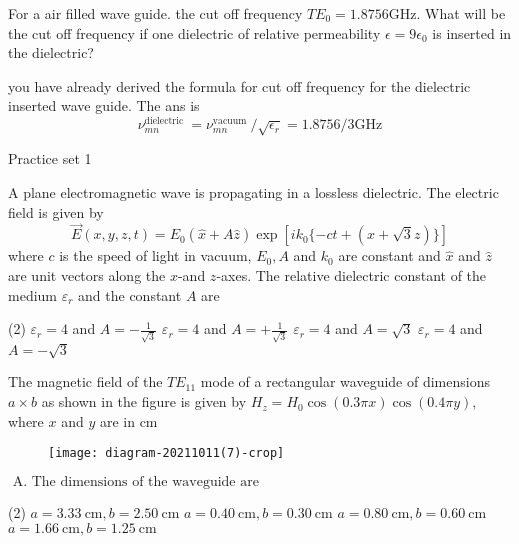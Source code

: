 \begin{exercise}
 For a air filled wave guide. the cut off frequency $T E_{0}=1.8756 \mathrm{GHz}$. What will be the cut off frequency if one dielectric of relative permeability $\epsilon=9 \epsilon_{0}$ is inserted in the dielectric?
\end{exercise}
\begin{answer}
 you have already derived the formula for cut off frequency for the dielectric inserted wave guide. The ans is
$$
\nu_{m n}^{\text {dielectric }}=\nu_{m n}^{\text {vacuum }} / \sqrt{\epsilon_{r}}=1.8756 / 3 \mathrm{GHz}
$$	
\end{answer}
\newpage
\begin{abox}
	Practice set 1
	\end{abox}
\begin{enumerate}
\begin{minipage}{\textwidth}
	\item A plane electromagnetic wave is propagating in a lossless dielectric. The electric field is given by
	$$
	\vec{E}(x, y, z, t)=E_{0}(\hat{x}+A \hat{z}) \exp \left[i k_{0}\{-c t+(x+\sqrt{3} z)\}\right]
	$$
	where $c$ is the speed of light in vacuum, $E_{0}, A$ and $k_{0}$ are constant and $\hat{x}$ and $\hat{z}$ are unit vectors along the $x$-and $z$-axes. The relative dielectric constant of the medium $\varepsilon_{r}$ and the constant $A$ are
\end{minipage}
\begin{tasks}(2)
	\task[\textbf{A.}]$\varepsilon_{r}=4$ and $A=-\frac{1}{\sqrt{3}}$
	\task[\textbf{B.}]$\varepsilon_{r}=4$ and $A=+\frac{1}{\sqrt{3}}$
	\task[\textbf{C.}]$\varepsilon_{r}=4$ and $A=\sqrt{3}$
	\task[\textbf{D.}]$\varepsilon_{r}=4$ and $A=-\sqrt{3}$
\end{tasks}
\begin{minipage}{\textwidth}
	\item The magnetic field of the $T E_{11}$ mode of a rectangular waveguide of dimensions $a \times b$ as shown in the figure is given by $H_{z}=H_{0} \cos (0.3 \pi x) \cos (0.4 \pi y)$, where $x$ and $y$ are in cm
	\begin{figure}[H]
		\centering
		\texttt{[image: diagram-20211011(7)-crop]}
	\end{figure}
\end{minipage}
$\text { A. The dimensions of the waveguide are }$
\begin{tasks}(2)
	\task[\textbf{A.}] $a=3.33 \mathrm{~cm}, b=2.50 \mathrm{~cm}$
	\task[\textbf{B.}]$a=0.40 \mathrm{~cm}, b=0.30 \mathrm{~cm}$
	\task[\textbf{C.}]$a=0.80 \mathrm{~cm}, b=0.60 \mathrm{~cm}$
	\task[\textbf{D.}] $a=1.66 \mathrm{~cm}, b=1.25 \mathrm{~cm}$
\end{tasks}


\end{enumerate}
